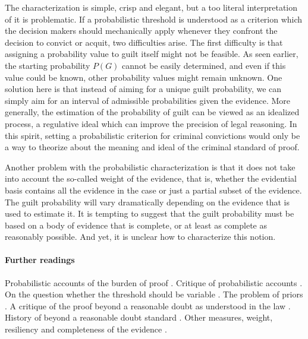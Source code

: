 \documentclass[10pt]{article}
\begin{document}
The characterization is simple, crisp and elegant, but a too literal interpretation of it is problematic.  If a probabilistic threshold is understood as a criterion which the decision makers 
 should mechanically apply whenever they confront the decision to convict or acquit, two difficulties arise. The first difficulty is that assigning a probability value to guilt itself might not be feasible. As seen earlier, the starting probability $P(G)$ cannot be easily determined, 
and even if this value could be known, other probability values might remain unknown. One solution here is that instead 
 of aiming for a unique guilt probability, we can simply aim for an interval of admissible probabilities given the evidence. 
 More generally, the estimation of the probability of guilt can be viewed as an idealized process, a regulative ideal which can improve the precision of legal reasoning. 
In this spirit, setting a probabilistic criterion for criminal convictions would only be a way 
to theorize about the meaning and ideal of the criminal standard of proof. 

Another problem with the probabilistic characterization 
is that it does not take into account the so-called weight of the evidence, that is, whether the evidential basis contains all the evidence 
in the case or just a partial subset of the evidence. The guilt probability will vary dramatically 
depending on the evidence that is used to estimate it. It is tempting to suggest that the guilt probability must be based on a body 
of evidence that is complete, or at least as complete as reasonably possible. And yet, it is unclear how to characterize this notion.

\paragraph{Further readings}

Probabilistic accounts of the burden of proof
\citep{kaplan1968, kaye1986, kaye1999, hamer2004, cheng2013}.
Critique of probabilistic accounts \citep{cohen1977, nesson79, thomson86, stein05, ho08, pardoAllen2008, haack2011}.
On the question whether the threshold should be variable \citep{kaplow2012, picinali2013}.
The problem of priors \citep{finkelsteinFairley1970, friedman2000}.
A critique of the proof beyond a reasonable doubt  
as understood in the law \citep{laudan2006}.
History of beyond a reasonable doubt standard 
\citep{shapiro1991, whitman2008}. Other measures, weight, resiliency and completeness 
of the evidence \citep{kaye1999, stein05}.
\end{document}
